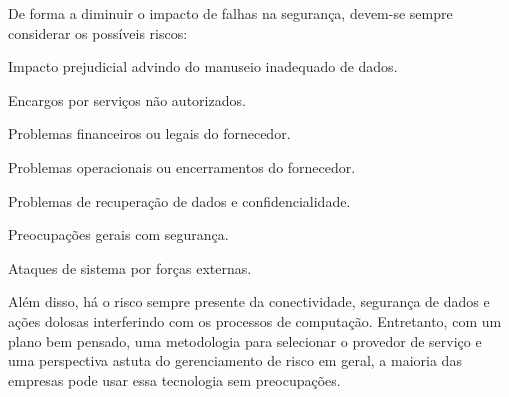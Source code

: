 \undef\itemm

De forma a diminuir o impacto de falhas na segurança, devem-se sempre considerar os
possíveis riscos:
\begin{itemise}
    \item Impacto prejudicial advindo do manuseio inadequado de dados.
    \item Encargos por serviços não autorizados.
    \item Problemas financeiros ou legais do fornecedor.
    \item Problemas operacionais ou encerramentos do fornecedor.
    \item Problemas de recuperação de dados e confidencialidade.
    \item Preocupações gerais com segurança.
    \item Ataques de sistema por forças externas.
\end{itemise}

Além disso, há o risco sempre presente da conectividade, segurança de dados e
ações dolosas interferindo com os processos de computação. Entretanto, com um
plano bem pensado, uma metodologia para selecionar o provedor de serviço e uma
perspectiva astuta do gerenciamento de risco em geral, a maioria das empresas
pode usar essa tecnologia sem preocupações.
